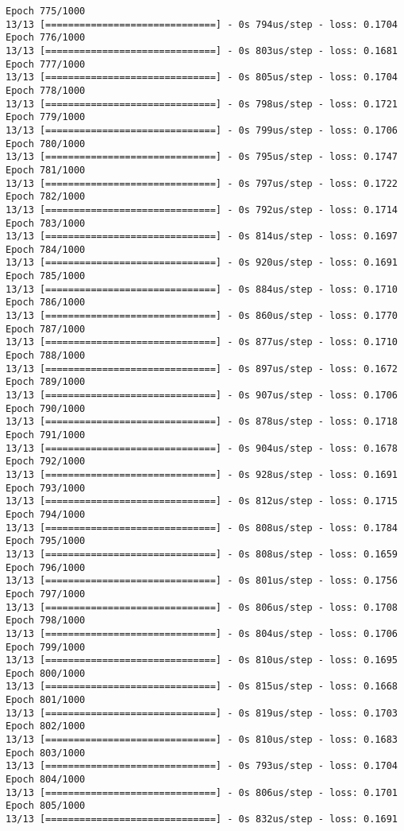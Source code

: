 \documentclass[11pt]{article}
\begin{document}
\begin{Verbatim}[commandchars=\\\{\}]
Epoch 775/1000
13/13 [==============================] - 0s 794us/step - loss: 0.1704
Epoch 776/1000
13/13 [==============================] - 0s 803us/step - loss: 0.1681
Epoch 777/1000
13/13 [==============================] - 0s 805us/step - loss: 0.1704
Epoch 778/1000
13/13 [==============================] - 0s 798us/step - loss: 0.1721
Epoch 779/1000
13/13 [==============================] - 0s 799us/step - loss: 0.1706
Epoch 780/1000
13/13 [==============================] - 0s 795us/step - loss: 0.1747
Epoch 781/1000
13/13 [==============================] - 0s 797us/step - loss: 0.1722
Epoch 782/1000
13/13 [==============================] - 0s 792us/step - loss: 0.1714
Epoch 783/1000
13/13 [==============================] - 0s 814us/step - loss: 0.1697
Epoch 784/1000
13/13 [==============================] - 0s 920us/step - loss: 0.1691
Epoch 785/1000
13/13 [==============================] - 0s 884us/step - loss: 0.1710
Epoch 786/1000
13/13 [==============================] - 0s 860us/step - loss: 0.1770
Epoch 787/1000
13/13 [==============================] - 0s 877us/step - loss: 0.1710
Epoch 788/1000
13/13 [==============================] - 0s 897us/step - loss: 0.1672
Epoch 789/1000
13/13 [==============================] - 0s 907us/step - loss: 0.1706
Epoch 790/1000
13/13 [==============================] - 0s 878us/step - loss: 0.1718
Epoch 791/1000
13/13 [==============================] - 0s 904us/step - loss: 0.1678
Epoch 792/1000
13/13 [==============================] - 0s 928us/step - loss: 0.1691
Epoch 793/1000
13/13 [==============================] - 0s 812us/step - loss: 0.1715
Epoch 794/1000
13/13 [==============================] - 0s 808us/step - loss: 0.1784
Epoch 795/1000
13/13 [==============================] - 0s 808us/step - loss: 0.1659
Epoch 796/1000
13/13 [==============================] - 0s 801us/step - loss: 0.1756
Epoch 797/1000
13/13 [==============================] - 0s 806us/step - loss: 0.1708
Epoch 798/1000
13/13 [==============================] - 0s 804us/step - loss: 0.1706
Epoch 799/1000
13/13 [==============================] - 0s 810us/step - loss: 0.1695
Epoch 800/1000
13/13 [==============================] - 0s 815us/step - loss: 0.1668
Epoch 801/1000
13/13 [==============================] - 0s 819us/step - loss: 0.1703
Epoch 802/1000
13/13 [==============================] - 0s 810us/step - loss: 0.1683
Epoch 803/1000
13/13 [==============================] - 0s 793us/step - loss: 0.1704
Epoch 804/1000
13/13 [==============================] - 0s 806us/step - loss: 0.1701
Epoch 805/1000
13/13 [==============================] - 0s 832us/step - loss: 0.1691

\end{Verbatim}
\end{document}
